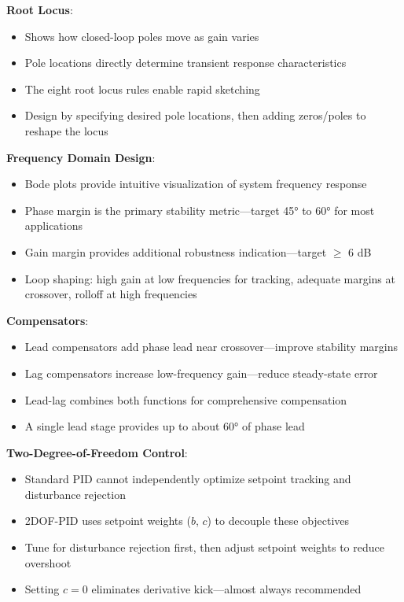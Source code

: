 \textbf{Root Locus}:
\begin{itemize}
    \item Shows how closed-loop poles move as gain varies
    \item Pole locations directly determine transient response characteristics
    \item The eight root locus rules enable rapid sketching
    \item Design by specifying desired pole locations, then adding zeros/poles to reshape the locus
\end{itemize}

\textbf{Frequency Domain Design}:
\begin{itemize}
    \item Bode plots provide intuitive visualization of system frequency response
    \item Phase margin is the primary stability metric---target 45° to 60° for most applications
    \item Gain margin provides additional robustness indication---target $\geq$ 6 dB
    \item Loop shaping: high gain at low frequencies for tracking, adequate margins at crossover, rolloff at high frequencies
\end{itemize}

\textbf{Compensators}:
\begin{itemize}
    \item Lead compensators add phase lead near crossover---improve stability margins
    \item Lag compensators increase low-frequency gain---reduce steady-state error
    \item Lead-lag combines both functions for comprehensive compensation
    \item A single lead stage provides up to about 60° of phase lead
\end{itemize}

\textbf{Two-Degree-of-Freedom Control}:
\begin{itemize}
    \item Standard PID cannot independently optimize setpoint tracking and disturbance rejection
    \item 2DOF-PID uses setpoint weights ($b$, $c$) to decouple these objectives
    \item Tune for disturbance rejection first, then adjust setpoint weights to reduce overshoot
    \item Setting $c = 0$ eliminates derivative kick---almost always recommended
\end{itemize}


